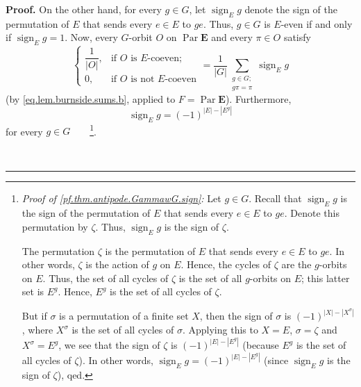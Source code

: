\documentclass[numbers=enddot,12pt,final,onecolumn,notitlepage,abstracton]{scrartcl}
\theoremstyle{definition}
\newenvironment{proof}[1][Proof]{\noindent\textbf{#1.} }{\ \rule{0.5em}{0.5em}}
\let\sumnonlimits\sum
\renewcommand{\sum}{\sumnonlimits\limits}
\newcommand{\Par}{\operatorname{Par}}
\newcommand{\sign}{\operatorname{sign}}
\newcommand{\EE}{{\mathbf{E}}}
\begin{document}
\begin{proof}
On the other hand, for every $g\in G$, let $\sign_E g$
denote the sign of the permutation of $E$ that sends every
$e\in E$ to $ge$. Thus, $g\in G$ is $E$-even if and only if
$\sign_E g = 1$. Now, every $G$-orbit $O$ on $\Par \EE $
and every $\pi\in O$ satisfy%
\begin{equation}%
\begin{cases}
\dfrac{1}{\left\vert O\right\vert }, & \text{if }O\text{ is }E\text{-coeven};\\
0, & \text{if }O\text{ is not }E\text{-coeven}%
\end{cases}
=\dfrac{1}{\left\vert G\right\vert }\sum_{\substack{g\in G; \\ g\pi = \pi}}
\sign_E g
\label{pf.thm.antipode.GammawG.signed}
\end{equation}
(by \eqref{eq.lem.burnside.sums.b}, applied to $F = \Par\EE$). Furthermore,
\begin{equation}
\sign_E g = \left(  -1\right)  ^{\left\vert
E\right\vert -\left\vert E^{g}\right\vert }
\label{pf.thm.antipode.GammawG.sign}
\end{equation}
for every $g\in G$\ \ \ \ \footnote{\textit{Proof of
\eqref{pf.thm.antipode.GammawG.sign}:} Let $g\in G$. Recall that
$\sign_E g$ is the sign of the permutation of $E$
that sends every $e\in E$ to $ge$. Denote this permutation by $\zeta$.
Thus, $\sign_E g$ is the sign of $\zeta$.
\par
The permutation $\zeta$ is the permutation of $E$
that sends every $e \in E$ to $ge$. In other words,
$\zeta$ is the action of $g$ on $E$.
Hence, the cycles of $\zeta$ are the $g$-orbits on $E$.
Thus, the set of all cycles of $\zeta$ is the set
of all $g$-orbits on $E$; this latter set is $E^g$.
Hence, $E^g$ is the set of all cycles of $\zeta$.
\par
But if $\sigma$ is a permutation of a
finite set $X$, then the sign of $\sigma$ is $\left(  -1\right)  ^{\left\vert
X\right\vert -\left\vert X^{\sigma}\right\vert }$, where $X^{\sigma}$ is the
set of all cycles of $\sigma$. Applying this to $X=E$,
$\sigma=\zeta$ and $X^{\sigma}=E^{g}$, we see that the sign of $\zeta$
is $\left(  -1\right)  ^{\left\vert
E\right\vert -\left\vert E^{g}\right\vert }$
(because $E^g$ is the set of all cycles of $\zeta$).
In other words,
$\sign_E g = \left(  -1\right)  ^{\left\vert
E\right\vert -\left\vert E^{g}\right\vert }$ (since
$\sign_E g$ is the sign of $\zeta$), qed.}.


\end{proof}
\end{document}
